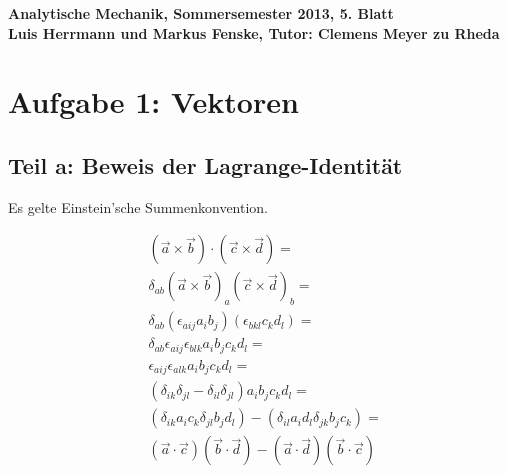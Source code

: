\documentclass[a4paper,german,12pt,smallheadings]{scrartcl}
\begin{document}
\begin{center}
\bfseries %
\sffamily %
\vspace{-40pt}
Analytische Mechanik, Sommersemester 2013, 5. Blatt \\
Luis Herrmann und Markus Fenske, Tutor: Clemens Meyer zu Rheda
\vspace{-10pt}
\end{center}
\section*{Aufgabe 1: Vektoren}
\subsection*{Teil a: Beweis der Lagrange-Identität}

Es gelte Einstein'sche Summenkonvention.

\begin{align*}
  &(\vec{a} \times \vec{b}) \cdot (\vec{c} \times \vec{d}) =\\
  &\delta_{ab}(\vec{a} \times \vec{b})_a (\vec{c} \times \vec{d})_b =\\
  &\delta_{ab}(\epsilon_{aij} a_i b_j) (\epsilon_{bkl}c_k d_l) =\\
  &\delta_{ab}\epsilon_{aij}\epsilon_{blk} a_i b_jc_kd_l =\\
  &\epsilon_{aij}\epsilon_{alk} a_i b_jc_kd_l =\\
  &(\delta_{ik}\delta_{jl}-\delta_{il}\delta_{jl}) a_i b_j c_k d_l =\\
  &(\delta_{ik}a_ic_k \delta_{jl}b_jd_l)-(\delta_{il}a_id_l\delta_{jk}b_jc_k) =\\
  &(\vec{a} \cdot \vec{c})(\vec{b} \cdot \vec{d})-(\vec{a}\cdot\vec{d})(\vec{b} \cdot \vec{c})
\end{align*}
\end{document}
